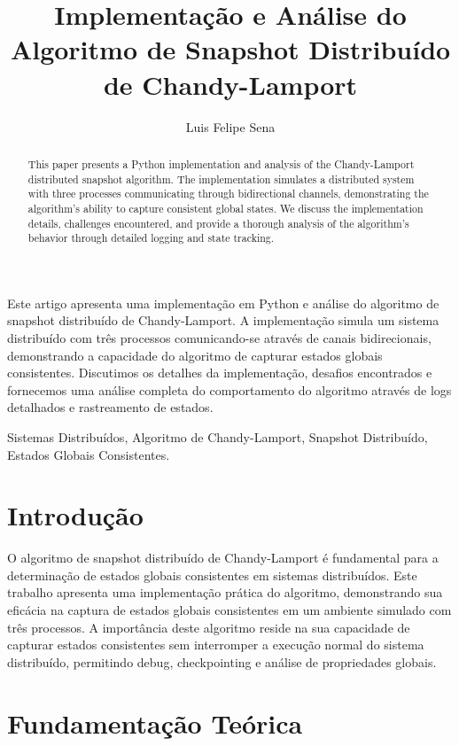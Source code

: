 \documentclass[12pt]{article}
\title{Implementação e Análise do Algoritmo de Snapshot Distribuído de Chandy-Lamport}
\author{Luis Felipe Sena}
\begin{document}
 
\maketitle

\begin{abstract}
This paper presents a Python implementation and analysis of the Chandy-Lamport distributed snapshot algorithm. The implementation simulates a distributed system with three processes communicating through bidirectional channels, demonstrating the algorithm's ability to capture consistent global states. We discuss the implementation details, challenges encountered, and provide a thorough analysis of the algorithm's behavior through detailed logging and state tracking.
\end{abstract}

\begin{resumo}
Este artigo apresenta uma implementação em Python e análise do algoritmo de snapshot distribuído de Chandy-Lamport. A implementação simula um sistema distribuído com três processos comunicando-se através de canais bidirecionais, demonstrando a capacidade do algoritmo de capturar estados globais consistentes. Discutimos os detalhes da implementação, desafios encontrados e fornecemos uma análise completa do comportamento do algoritmo através de logs detalhados e rastreamento de estados.
\end{resumo}

\begin{keywords}
Sistemas Distribuídos, Algoritmo de Chandy-Lamport, Snapshot Distribuído, Estados Globais Consistentes.
\end{keywords}

\section{Introdução}

O algoritmo de snapshot distribuído de Chandy-Lamport \cite{chandy1985distributed} é fundamental para a determinação de estados globais consistentes em sistemas distribuídos. Este trabalho apresenta uma implementação prática do algoritmo, demonstrando sua eficácia na captura de estados globais consistentes em um ambiente simulado com três processos. A importância deste algoritmo reside na sua capacidade de capturar estados consistentes sem interromper a execução normal do sistema distribuído, permitindo debug, checkpointing e análise de propriedades globais.

\section{Fundamentação Teórica}
\end{document}
